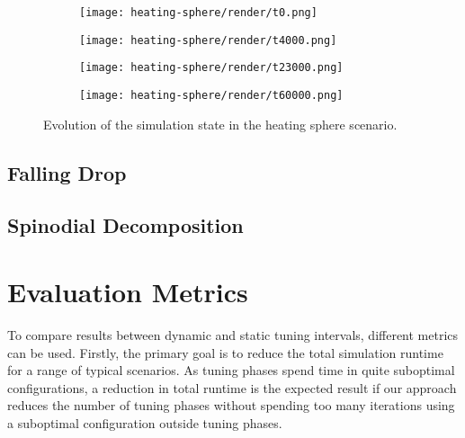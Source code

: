 \begin{figure}[htpb]
	\centering
	\fastcolorbarhor
	
	\begin{subfigure}[c]{.25\textwidth} 
		\texttt{[image: heating-sphere/render/t0.png]}
	\end{subfigure}%
	\begin{subfigure}[c]{.25\textwidth}
		\texttt{[image: heating-sphere/render/t4000.png]}
	\end{subfigure}%
	\begin{subfigure}[c]{.25\textwidth}
		\texttt{[image: heating-sphere/render/t23000.png]}
	\end{subfigure}%
	\begin{subfigure}[c]{.25\textwidth}
		\vspace*{0.1\textwidth}
		\centering
		\texttt{[image: heating-sphere/render/t60000.png]}
		\vspace*{0.1\textwidth}
	\end{subfigure}%
	\label{fig:evolution_hs}
	\caption{Evolution of the simulation state in the heating sphere scenario.}
\end{figure}

\subsection{Falling Drop}
\label{subsec:fd}
\subsection{Spinodial Decomposition}
\label{subsec:sd}

\section{Evaluation Metrics}
\label{sec:metrics}
To compare results between dynamic and static tuning intervals, different metrics can be used.
Firstly, the primary goal is to reduce the total simulation runtime for a range of typical scenarios. As tuning phases spend time in quite suboptimal configurations, a reduction in total runtime is the expected result if our approach reduces the number of tuning phases without spending too many iterations using a suboptimal configuration outside tuning phases.

